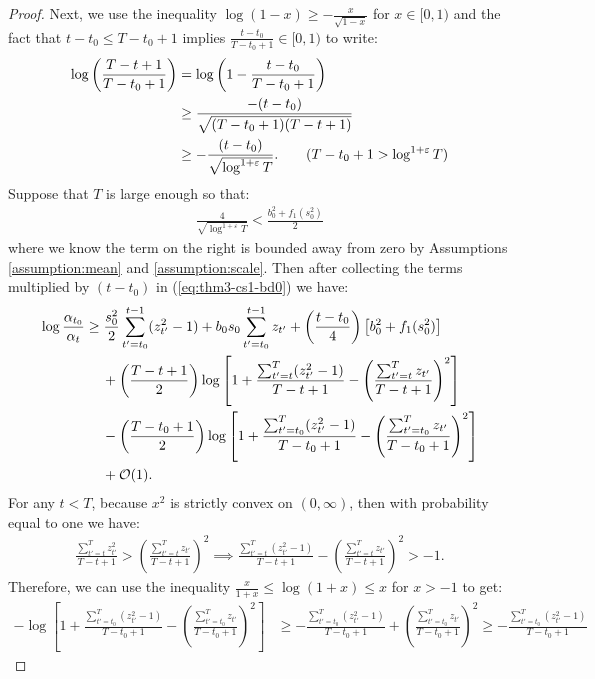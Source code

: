 \begin{proof}
Next, we use the inequality $\log(1 - x) \geq -\frac{x}{\sqrt{1-x}}$ for $x \in [0,1)$ and the fact that $t - t_0 \leq T-t_0+1$ implies $\frac{t-t_0}{T-t_0+1}\in [0,1)$ to write: 
\begin{align*}
    \log \left(\frac{T-t+1}{T-t_0+1}\right) &= \log\left(1 - \frac{t-t_0}{T-t_0+1}\right) \\
    &\geq \frac{-(t-t_0)}{\sqrt{(T-t_0+1)(T-t+1)}}  \\
    &\geq -\frac{(t-t_0)}{\sqrt{\log^{1+\varepsilon} T}}. \tag{$T-t_0+1 > \log^{1+\varepsilon} T$}
\end{align*}
Suppose that $T$ is large enough so that: 
\begin{align*}
    \frac{4}{\sqrt{\log^{1+\varepsilon} T}} < \frac{b_0^2+ f_1(s_0^2)}{2}
\end{align*}
where we know the term on the right is bounded away from zero by Assumptions \ref{assumption:mean} and \ref{assumption:scale}. Then after collecting the terms multiplied by $(t-t_0)$ in (\ref{eq:thm3-cs1-bd0}) we have: 
\begin{align}
    \log \frac{\alpha_{t_0}}{\alpha_t} &\geq  \frac{s_0^2}{2} \sum_{t' = t_0}^{t - 1} (z_{t'}^2-1) + b_0 s_0 \sum_{t' = t_0}^{t - 1} z_{t'} + \left(\frac{t-t_0}{4}\right)\left[b_0^2 + f_1(s_0^2)\right] \notag \\
    &\quad\: + \left(\frac{T - t +1}{2}\right)\log\left[1 + \frac{\sum_{t'=t}^T (z_{t'}^2-1)}{T-t+1} - \left(\frac{\sum_{t'=t}^T z_{t'}}{T-t+1}\right)^2\right]\notag \\
    &\quad\: -\left(\frac{T - t_0 +1}{2}\right)\log\left[1 + \frac{\sum_{t'=t_0}^T (z_{t'}^2 -1)}{T-t_0+1} - \left(\frac{\sum_{t'=t_0}^T z_{t'}}{T-t_0+1}\right)^2\right] \notag \\
    &\quad\: + \mathcal{O}(1). \label{eq:thm3-cs1-bd1}
\end{align}
For any $t < T$, because $x^2$ is strictly convex on $(0,\infty)$, then with probability equal to one we have:
\begin{align}
      \frac{\sum_{t'=t}^T z_{t'}^2}{T-t+1} > \left(\frac{\sum_{t'=t}^T z_{t'}}{T-t+1}\right)^2 \implies \frac{\sum_{t'=t}^T (z_{t'}^2 -1)}{T-t+1} - \left(\frac{\sum_{t'=t}^T z_{t'}}{T-t+1}\right)^2 > -1. \label{eq:neg1-bd}
\end{align}
Therefore, we can use the inequality $\frac{x}{1+x} \leq \log(1+x) \leq x$ for $x > -1$ to get:
\small
\begin{align*}
    -\log\left[1 + \frac{\sum_{t'=t_0}^T (z_{t'}^2 -1)}{T-t_0+1} - \left(\frac{\sum_{t'=t_0}^T z_{t'}}{T-t_0+1}\right)^2\right] &\geq -\frac{\sum_{t'=t_0}^T (z_{t'}^2 -1)}{T-t_0+1} + \left(\frac{\sum_{t'=t_0}^T z_{t'}}{T-t_0+1}\right)^2 \geq -\frac{\sum_{t'=t_0}^T (z_{t'}^2 -1)}{T-t_0+1}

\end{align*}
\end{proof}
